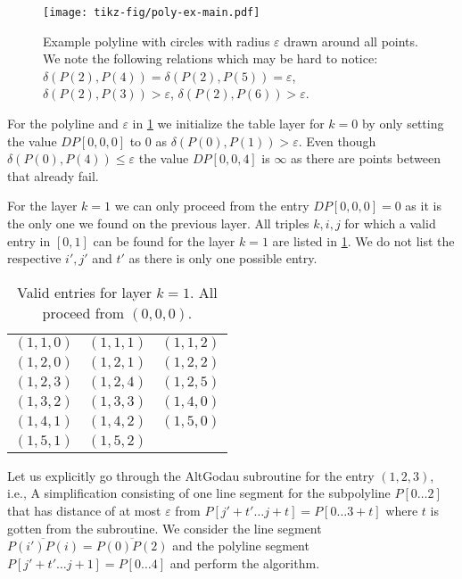 \begin{figure}
  \centering
  \texttt{[image: tikz-fig/poly-ex-main.pdf]}
  \caption{Example polyline with circles with radius \(\varepsilon\) drawn around all points. We note the following relations which may be hard to notice: \(\delta(P(2), P(4)) = \delta(P(2), P(5)) = \varepsilon\), \(\delta(P(2), P(3)) > \varepsilon\), \(\delta(P(2), P(6)) > \varepsilon\).}
  \label{fig:poly-ex-main}
\end{figure}

For the polyline and \(\varepsilon\) in \cref{fig:poly-ex-main} we initialize the table layer for \(k = 0\) by only setting the value \(DP[0,0,0]\) to \(0\) as \(\delta(P(0), P(1)) > \varepsilon\). Even though \(\delta(P(0), P(4)) \leq \varepsilon\) the value \(DP[0,0,4]\) is \(\infty\) as there are points between that already fail.

For the layer \(k = 1\) we can only proceed from the entry \(DP[0,0,0] = 0\) as it is the only one we found on the previous layer. All triples \(k, i, j\) for which a valid entry in \([0, 1]\) can be found for the layer \(k = 1\) are listed in \cref{tab:exlayer1}. We do not list the respective \(i', j'\) and \(t'\) as there is only one possible entry.
\begin{table}[ht]
\centering
\begin{tabular}{|ccc|}
\hline
$(1,1,0)$ & $(1,1,1)$ & $(1,1,2)$ \\
$(1,2,0)$ & $(1,2,1)$ & $(1,2,2)$ \\
$(1,2,3)$ & $(1,2,4)$ & $(1,2,5)$ \\
$(1,3,2)$ & $(1,3,3)$ & $(1,4,0)$ \\
$(1,4,1)$ & $(1,4,2)$ & $(1,5,0)$ \\
$(1,5,1)$ & $(1,5,2)$ & \\
\hline
\end{tabular}
\caption{Valid entries for layer \(k = 1\). All proceed from \((0,0,0)\).}
\label{tab:exlayer1}
\end{table}

Let us explicitly go through the AltGodau subroutine for the entry \((1, 2, 3)\), i.e., A simplification consisting of one line segment for the subpolyline \(P[0\dots 2]\) that has distance of at most \(\varepsilon\) from \(P[j' + t'\dots j + t] = P[0 \dots 3 + t]\) where \(t\) is gotten from the subroutine. We consider the line segment \(\overline{P(i')P(i)} = \overline{P(0)P(2)}\) and the polyline segment \(P[j' + t' \dots j + 1] = P[0 \dots 4]\) and perform the algorithm. 

